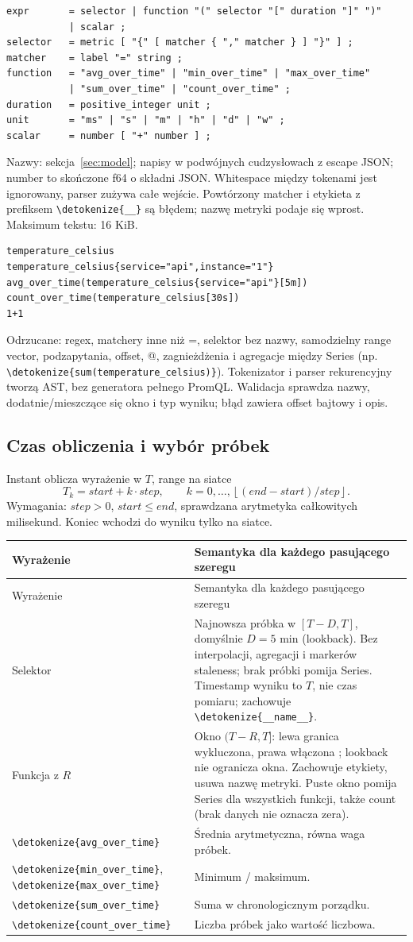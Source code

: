 \documentclass[11pt,a4paper]{article}
\newcommand{\code}[1]{\expandafter\nolinkurl\expandafter{\detokenize{#1}}}
\newcommand{\tabhead}[1]{\toprule #1\\ \midrule\endfirsthead
  \toprule #1\\ \midrule\endhead \bottomrule\endfoot}
\begin{document}
\begin{lstlisting}
expr       = selector | function "(" selector "[" duration "]" ")"
           | scalar ;
selector   = metric [ "{" [ matcher { "," matcher } ] "}" ] ;
matcher    = label "=" string ;
function   = "avg_over_time" | "min_over_time" | "max_over_time"
           | "sum_over_time" | "count_over_time" ;
duration   = positive_integer unit ;
unit       = "ms" | "s" | "m" | "h" | "d" | "w" ;
scalar     = number [ "+" number ] ;
\end{lstlisting}

Nazwy: sekcja~\ref{sec:model}; napisy w podwójnych cudzysłowach
z escape JSON; number to skończone f64 o składni JSON.
Whitespace między tokenami jest ignorowany, parser zużywa całe wejście.
Powtórzony matcher i etykieta z prefiksem \code{__} są błędem;
nazwę metryki podaje się wprost. Maksimum tekstu: 16 KiB.

\begin{lstlisting}
temperature_celsius
temperature_celsius{service="api",instance="1"}
avg_over_time(temperature_celsius{service="api"}[5m])
count_over_time(temperature_celsius[30s])
1+1
\end{lstlisting}

Odrzucane: regex, matchery inne niż =, selektor bez nazwy,
samodzielny range vector, podzapytania, offset, @, zagnieżdżenia
i agregacje między Series (np. \code{sum(temperature_celsius)}).
Tokenizator i parser rekurencyjny tworzą AST, bez generatora pełnego
PromQL. Walidacja sprawdza nazwy, dodatnie/mieszczące się okno i typ
wyniku; błąd zawiera offset bajtowy i opis.

\subsection{Czas obliczenia i wybór próbek}
Instant oblicza wyrażenie w $T$, range na siatce
\[
 T_k=start+k\cdot step,\qquad
 k=0,\ldots,\left\lfloor(end-start)/step\right\rfloor .
\]
Wymagania: $step>0$, $start\leq end$, sprawdzana arytmetyka całkowitych
milisekund. Koniec wchodzi do wyniku tylko na siatce.

\begin{longtable}{P{29mm}P{127mm}}
\tabhead{Wyrażenie & Semantyka dla każdego pasującego szeregu}
Selektor &
Najnowsza próbka w $[T-D,T]$, domyślnie $D=5$ min (lookback).
Bez interpolacji, agregacji i markerów staleness; brak próbki pomija Series.
Timestamp wyniku to $T$, nie czas pomiaru; zachowuje \code{__name__}.\\
Funkcja z $R$ &
Okno $(T-R,T]$: lewa granica wykluczona, prawa włączona
\cite{prom-basics}; lookback nie ogranicza okna.
Zachowuje etykiety, usuwa nazwę metryki. Puste okno pomija Series
dla wszystkich funkcji, także count (brak danych nie oznacza zera).\\
\code{avg_over_time} & Średnia arytmetyczna, równa waga próbek.\\
\code{min_over_time}, \code{max_over_time} & Minimum / maksimum.\\
\code{sum_over_time} & Suma w chronologicznym porządku.\\
\code{count_over_time} & Liczba próbek jako wartość liczbowa.\\
\end{longtable}
\end{document}
